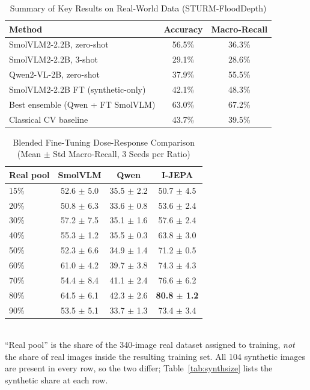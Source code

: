 \documentclass[conference]{IEEEtran}
\begin{document}
\begin{table}[t]
\caption{Summary of Key Results on Real-World Data (STURM-FloodDepth)}
\label{tab:summary}
\centering
\begin{tabular}{lcc}
\toprule
\textbf{Method} & \textbf{Accuracy} & \textbf{Macro-Recall} \\
\midrule
SmolVLM2-2.2B, zero-shot & 56.5\% & 36.3\% \\
SmolVLM2-2.2B, 3-shot & 29.1\% & 28.6\% \\
Qwen2-VL-2B, zero-shot & 37.9\% & 55.5\% \\
SmolVLM2-2.2B FT (synthetic-only) & 42.1\% & 48.3\% \\
Best ensemble (Qwen + FT SmolVLM) & 63.0\% & 67.2\% \\
Classical CV baseline & 43.7\% & 39.5\% \\
\bottomrule
\end{tabular}
\end{table}

\begin{table}[t]
\caption{Blended Fine-Tuning Dose-Response Comparison (Mean $\pm$ Std Macro-Recall, 3 Seeds per Ratio)}
\label{tab:doseresponse}
\centering
\begin{tabular}{lccc}
\toprule
\textbf{Real pool} & \textbf{SmolVLM} & \textbf{Qwen} & \textbf{I-JEPA} \\
\midrule
15\%  & 52.6 $\pm$ 5.0 & 35.5 $\pm$ 2.2 & 50.7 $\pm$ 4.5 \\
20\%  & 50.8 $\pm$ 6.3 & 33.6 $\pm$ 0.8 & 53.6 $\pm$ 2.4 \\
30\%  & 57.2 $\pm$ 7.5 & 35.1 $\pm$ 1.6 & 57.6 $\pm$ 2.4 \\
40\%  & 55.3 $\pm$ 1.2 & 35.5 $\pm$ 0.3 & 63.8 $\pm$ 3.0 \\
50\%  & 52.3 $\pm$ 6.6 & 34.9 $\pm$ 1.4 & 71.2 $\pm$ 0.5 \\
60\%  & 61.0 $\pm$ 4.2 & 39.7 $\pm$ 3.8 & 74.3 $\pm$ 4.3 \\
70\%  & 54.4 $\pm$ 8.4 & 41.1 $\pm$ 2.4 & 76.6 $\pm$ 6.2 \\
80\%  & 64.5 $\pm$ 6.1 & 42.3 $\pm$ 2.6 & \textbf{80.8 $\pm$ 1.2} \\
90\%  & 53.5 $\pm$ 5.1 & 33.7 $\pm$ 1.3 & 73.4 $\pm$ 3.4 \\
\bottomrule
\end{tabular}
\\[2pt]
{\footnotesize ``Real pool'' is the share of the 340-image real dataset assigned to training, \emph{not} the share of real images inside the resulting training set. All 104 synthetic images are present in every row, so the two differ; Table~\ref{tab:synthsize} lists the synthetic share at each row.}
\end{table}
\end{document}
